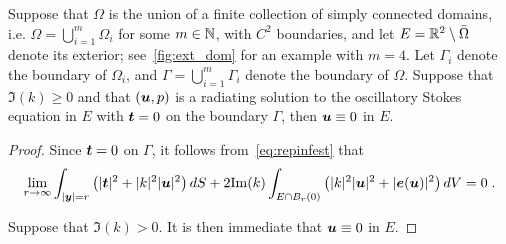 \begin{thrm}
  Suppose that $\Omega$ is the union of a finite collection 
  of simply connected domains, i.e. $\Omega = \bigcup_{i=1}^m \Omega_{i}$
  for some $m \in \mathbb{N}$, with $C^{2}$ boundaries, 
  and let $E = \mathbb{R}^{2} \setminus \bar{\Omega}$ denote its exterior;
  see~\cref{fig:ext_dom} for an example with $m=4$.
  Let $\Gamma_{i}$ denote the boundary of $\Omega_{i}$, 
  and $\Gamma = \bigcup_{i=1}^{m} \Gamma_{i}$ denote the boundary
  of $\Omega$.
  Suppose that $\Im(k)\geq 0$ and 
  that $({\boldsymbol u},p)$ is a radiating solution to the oscillatory Stokes
  equation in $E$ with ${\boldsymbol t} = 0$ on the boundary $\Gamma$, then
  ${\boldsymbol u} \equiv 0$ in $E$.
\end{thrm}

\begin{proof}
Since ${\boldsymbol t} = 0$ on $\Gamma$, it follows
from~\cref{eq:repinfest} that
\begin{equation}
\lim_{r\to\infty}
\int_{|{\boldsymbol y}|=r} \left( |{\boldsymbol t}|^2 + |k|^2 |{\boldsymbol u}|^2 \right) dS +
2 {\textrm{\textup{Im}}}(k) \int_{E \cap B_{r}(0)} \left(|k|^2 |{\boldsymbol u}|^2 + |{\boldsymbol e}({\boldsymbol u})|^2 \right)
dV = 0 \; . \nonumber
\end{equation}

Suppose that $\Im(k) > 0$. It is then immediate
that ${\boldsymbol u} \equiv 0$ in $E$.


\end{proof}
